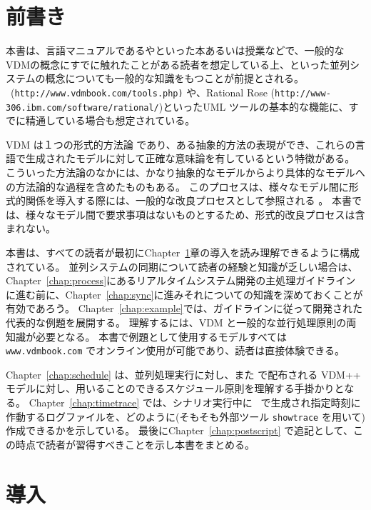 \documentclass[\pformat,12pt]{jreport}
\begin{document}

\chapter*{前書き}

本書は、言語マニュアルである\cite{LangManPP}や\cite{Fitzgerald&05}といった本あるいは授業などで、一般的なVDMの概念にすでに触れたことがある読者を想定している上、\cite{Ben-Ari82,Hoare85,Chandy&88,Milner89,Lea99}といった並列システムの概念についても一般的な知識をもつことが前提とされる。
\VDMTools\ (\texttt{http://www.vdmbook.com/tools.php)} や、Rational Rose (\texttt{http://www-306.ibm.com/software/rational/})といったUML ツールの基本的な機能に、すでに精通している場合も想定されている。

VDM \cite{Jones90a,Dawes91,Fitzgerald&98} は１つの形式的方法論\cite{Craigen&93b,Hinchey&95} であり、ある抽象的方法の表現ができ、これらの言語で生成されたモデルに対して正確な意味論を有しているという特徴がある。
こういった方法論のなかには、かなり抽象的なモデルからより具体的なモデルへの方法論的な過程を含めたものもある。
このプロセスは、様々なモデル間に形式的関係を導入する際には、一般的な改良プロセスとして参照される \cite{Jones90a,Morgan90a,Woodcock&96,Back&98}。
本書では、様々なモデル間で要求事項はないものとするため、形式的改良プロセスは含まれない。

本書は、すべての読者が最初にChapter~\ref{chap:intro}章の導入を読み理解できるように構成されている。
並列システムの同期について読者の経験と知識が乏しい場合は、Chapter~\ref{chap:process}にあるリアルタイムシステム開発の主処理ガイドラインに進む前に、Chapter~\ref{chap:sync}に進みそれについての知識を深めておくことが有効であろう。
Chapter~\ref{chap:example}では、ガイドラインに従って開発された代表的な例題を展開する。
理解するには、VDM と一般的な並行処理原則の両知識が必要となる。
本書で例題として使用するモデルすべては \texttt{www.vdmbook.com} でオンライン使用が可能であり、読者は直接体験できる。

Chapter~\ref{chap:schedule} は、並列処理実行に対し、また \VDMTools で配布される VDM++ モデルに対し、用いることのできるスケジュール原則を理解する手掛かりとなる。
Chapter~\ref{chap:timetrace} では、シナリオ実行中に \VDMTools\ で生成され指定時刻に作動するログファイルを、どのように(そもそも外部ツール \texttt{showtrace} を用いて)作成できるかを示している。
最後にChapter~\ref{chap:postscript} で追記として、この時点で読者が習得すべきことを示し本書をまとめる。


\chapter{導入}\label{chap:intro}
\end{document}
